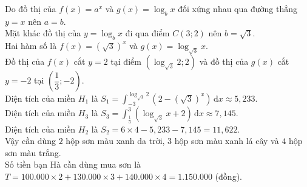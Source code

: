 \begin{bt}
{\begin{center}
	\end{center}
	Do đồ thị của $f(x)=a^x$ và  $g(x)=\log_bx$ đối xứng nhau qua đường thẳng $y=x$ nên $a=b$.\\
	Mặt khác đồ thị của  $y=\log_bx$ đi qua điểm $C(3;2)$ nên $b=\sqrt{3}$. \\
	Hai hàm số là  $f(x)=(\sqrt{3})^x$ và $g(x)=\log_{\sqrt{3}}x$.\\
	Đồ thị  của $f(x)$ cắt $y=2$ tại điểm $\left(\log_{\sqrt{3}}2;2\right)$ và đồ thị của $g(x)$ cắt $y=-2$ tại $\left(\dfrac{1}{3};-2\right)$. \\
	Diện tích của  miền $H_1$ là $S_1=\displaystyle\int^{\log_{\sqrt{3}}2}_{-3}\left(2-(\sqrt{3})^x\right)\,\mathrm{d}x\approx 5{,}233$. \\
	Diện tích của miền $H_3$ là $S_3=\displaystyle\int^3_{\tfrac{1}{3}}\left(\log_{\sqrt{3}}x+2\right)\,\mathrm{d}x\approx  7{,}145$. \\
	Diện tích của miền $H_2$ là $S_2=6\times 4 - 5{,}233  - 7{,}145=11{,}622$.\\
	Vậy cần dùng $2$ hộp sơn màu xanh da trời, $3$ hộp sơn màu xanh  lá cây và $4$ hộp sơn màu trắng.\\
	Số tiền bạn  Hà cần dùng mua sơn là\\ $T=100.000\times 2+130.000\times 3+140.000\times 4=1.150.000$ (đồng).
 }
\end{bt}

